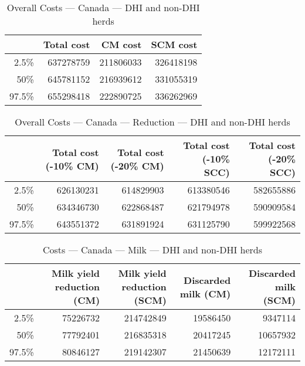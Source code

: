 \documentclass{article}\usepackage[]{graphicx}\usepackage[]{color}
\begin{document}
\begin{table}[ht]
\centering
\begin{tabular}{rrrr}
  \hline
 & Total cost & CM cost & SCM cost \\ 
  \hline
2.5\% & 637278759 & 211806033 & 326418198 \\ 
  50\% & 645781152 & 216939612 & 331055319 \\ 
  97.5\% & 655298418 & 222890725 & 336262969 \\ 
   \hline
\end{tabular}
\caption{Overall Costs --- Canada --- DHI and non-DHI herds} 
\label{tab:canada2:overall}
\end{table}
\begin{table}[ht]
\centering
\begin{tabular}{rrrrr}
  \hline
 & Total cost (-10\% CM) & Total cost (-20\% CM) & Total cost (-10\% SCC) & Total cost (-20\% SCC) \\ 
  \hline
2.5\% & 626130231 & 614829903 & 613380546 & 582655886 \\ 
  50\% & 634346730 & 622868487 & 621794978 & 590909584 \\ 
  97.5\% & 643551372 & 631891924 & 631125790 & 599922568 \\ 
   \hline
\end{tabular}
\caption{Overall Costs --- Canada --- Reduction --- DHI and non-DHI herds} 
\label{tab:canada2:reduction}
\end{table}
\begin{table}[ht]
\centering
\begin{tabular}{rrrrr}
  \hline
 & Milk yield reduction (CM) & Milk yield reduction (SCM) & Discarded milk (CM) & Discarded milk (SCM) \\ 
  \hline
2.5\% & 75226732 & 214742849 & 19586450 & 9347114 \\ 
  50\% & 77792401 & 216835318 & 20417245 & 10657932 \\ 
  97.5\% & 80846127 & 219142307 & 21450639 & 12172111 \\ 
   \hline
\end{tabular}
\caption{Costs --- Canada --- Milk --- DHI and non-DHI herds} 
\label{tab:canada2:a}
\end{table}
\end{document}
